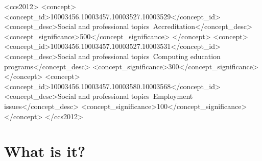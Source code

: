 \documentclass[sigconf]{acmart}
\begin{document}
 \begin{CCSXML}
<ccs2012>
<concept>
<concept_id>10003456.10003457.10003527.10003529</concept_id>
<concept_desc>Social and professional topics~Accreditation</concept_desc>
<concept_significance>500</concept_significance>
</concept>
<concept>
<concept_id>10003456.10003457.10003527.10003531</concept_id>
<concept_desc>Social and professional topics~Computing education programs</concept_desc>
<concept_significance>300</concept_significance>
</concept>
<concept>
<concept_id>10003456.10003457.10003580.10003568</concept_id>
<concept_desc>Social and professional topics~Employment issues</concept_desc>
<concept_significance>100</concept_significance>
</concept>
</ccs2012>
\end{CCSXML}




\maketitle

\section {What is it?}
\end{document}
